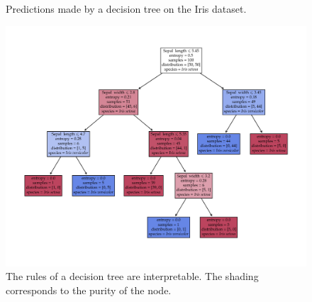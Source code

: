 \begin{figure}[tb]
	\hfill
	\caption{Predictions made by a decision tree on the Iris dataset. }\label{fig:tree}
\end{figure}

\begin{figure}[h]
	\centering
	\includegraphics[width=\textwidth]{machine_learning/figures/tree}
	\caption{The rules of a decision tree are interpretable. The shading corresponds to the purity of the node.\label{subfig:tree_explained}}
\end{figure}



